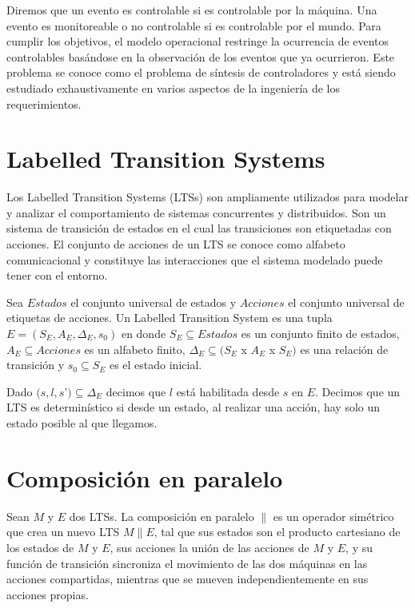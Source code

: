 \vspace{\baselineskip}
Diremos que un evento es controlable si es controlable por la máquina. Una evento es monitoreable o no controlable si es
controlable por el mundo. 
Para cumplir los objetivos, el modelo operacional restringe la ocurrencia de eventos controlables basándose en la observación
de los eventos que ya ocurrieron.
Este problema se conoce como el problema de síntesis de controladores y está siendo estudiado exhaustivamente en varios
aspectos de la ingeniería de los requerimientos.

\section{Labelled Transition Systems}
Los Labelled Transition Systems (LTSs) son ampliamente utilizados para modelar y analizar el comportamiento de sistemas
concurrentes y distribuidos. Son un sistema de transición de estados en el cual las transiciones son etiquetadas con
acciones. El conjunto de acciones de un LTS se conoce como alfabeto comunicacional y constituye las interacciones que
el sistema modelado puede tener con el entorno.

\vspace{\baselineskip}
Sea $Estados$ el conjunto universal de estados y $Acciones$ el conjunto universal de etiquetas de acciones.
Un Labelled Transition System es una tupla $E = (S_{E}, A_{E}, \Delta_{E}, s_{0})$ en donde
$S_{E} \subseteq Estados$ es un conjunto finito de estados, $A_{E} \subseteq Acciones$ es un alfabeto finito,
$\Delta_{E} \subseteq (S_{E}$ x $A_{E}$ x $S_{E})$ es una relación de transición y $s_{0} \subseteq S_{E}$ 
es el estado inicial.

\vspace{\baselineskip}
Dado $(s, l, s$’$) \subseteq \Delta_{E}$ decimos que $l$ está habilitada desde $s$ en $E$. Decimos que un LTS es
determinístico si desde un estado, al realizar una acción, hay solo un estado posible al que llegamos.

\section{Composición en paralelo}

Sean $M$ y $E$ dos LTSs. La composición en paralelo $\parallel$ es un operador simétrico que crea un nuevo LTS $M\parallel$$E$, 
tal que sus estados son el producto cartesiano de los estados de $M$ y $E$, sus acciones la unión de las acciones de $M$ y $E$, 
y su función de transición sincroniza el movimiento de las dos máquinas en las acciones compartidas, mientras que se 
mueven independientemente en sus acciones propias.

